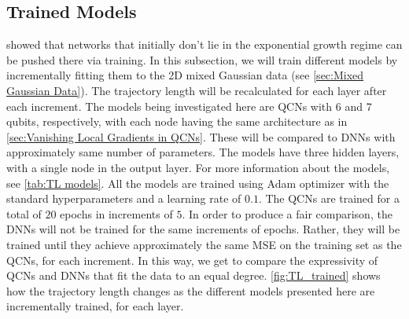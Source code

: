 \subsection{Trained Models}\label{sec:Trained Models}
\citet{raghu2017expressive} showed that networks that initially don't lie in the exponential growth regime can be pushed there via training. In this subsection, we will train different models by incrementally fitting them to the 2D mixed Gaussian data (see \autoref{sec:Mixed Gaussian Data}). The trajectory length will be recalculated for each layer after each increment. The models being investigated here are  QCNs with 6 and 7 qubits, respectively, with each node having the same architecture as in \autoref{sec:Vanishing Local Gradients in QCNs}. These will be compared to DNNs with approximately same number of parameters. The models have three hidden layers, with a single node in the output layer. For more information about the models, see \autoref{tab:TL models}. All the models are trained using Adam optimizer with the standard hyperparameters and a learning rate of $0.1$. The QCNs are trained for a total of $20$ epochs in increments of $5$. In order to produce a fair comparison, the DNNs will not be trained for the same increments of epochs. Rather, they will be trained until they achieve approximately the same MSE on the training set as the QCNs, for each increment. In this way, we get to compare the expressivity of QCNs and DNNs that fit the data to an equal degree. \autoref{fig:TL_trained} shows how the trajectory length changes as the different models presented here are incrementally trained, for each layer. 


